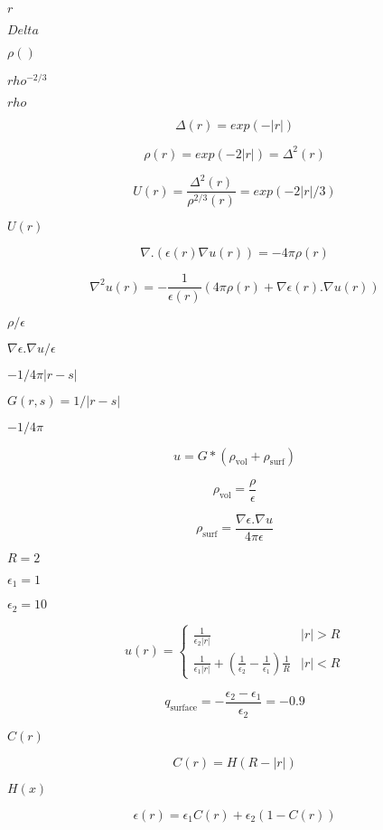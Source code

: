 \documentclass{article}
\begin{document}
$ r $
\pagebreak

$ Delta $
\pagebreak

$ \rho() $
\pagebreak

$ rho^{-2/3} $
\pagebreak

$ rho $
\pagebreak

\[ \Delta(r) = exp(- | r | ) \]
\pagebreak

\[ \rho(r) = exp(- 2 | r | ) = \Delta^2(r) \]
\pagebreak

\[ U(r) = \frac{\Delta^2 (r)}{\rho^{2/3} (r)} = exp( - 2 | r | / 3) \]
\pagebreak

$ U(r) $
\pagebreak

\[ \nabla . \left( \epsilon(r) \nabla u(r) \right) = - 4 \pi \rho(r) \]
\pagebreak

\[ \nabla^2 u(r) = - \frac{1}{\epsilon(r)} \left( 4 \pi \rho(r) + \nabla \epsilon(r) . \nabla u(r) \right) \]
\pagebreak

$\rho / \epsilon$
\pagebreak

$\nabla \epsilon . \nabla u / \epsilon$
\pagebreak

$-1 / 4 \pi |r-s|$
\pagebreak

$G(r,s) = 1/|r-s|$
\pagebreak

$-1/4\pi$
\pagebreak

\[ u = G * \left(\rho_{\mbox{vol}} + \rho_{\mbox{surf}} \right) \]
\pagebreak

\[ \rho_{\mbox{vol}} = \frac{\rho}{\epsilon} \]
\pagebreak

\[ \rho_{\mbox{surf}} = \frac{\nabla \epsilon . \nabla u}{4 \pi \epsilon} \]
\pagebreak

$R=2$
\pagebreak

$\epsilon_1 = 1$
\pagebreak

$\epsilon_2 = 10$
\pagebreak

\[ u(r) = \left \lbrace \begin{array}{cc} \frac{1}{\epsilon_2 |r|} & |r| > R \\ \frac{1}{\epsilon_1 |r|} + \left( \frac{1}{\epsilon_2} - \frac{1}{\epsilon_1} \right) \frac{1}{R} & |r| < R \end{array} \right . \]
\pagebreak

\[ q_{\mbox{surface}} = -\frac{\epsilon_2 - \epsilon_1}{\epsilon_2} = -0.9 \]
\pagebreak

$C(r)$
\pagebreak

\[ C(r) = H(R-|r|) \]
\pagebreak

$H(x)$
\pagebreak

\[ \epsilon(r) = \epsilon_1 C(r) + \epsilon_2 \left( 1 - C(r) \right) \]
\pagebreak
\end{document}
